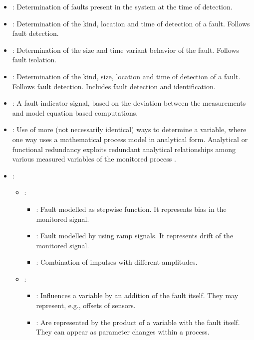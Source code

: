 \begin{itemize}
        \item {}: Determination of faults present in the system at the time of detection.
        \item {}: Determination of the kind, location and time of detection of a fault. Follows fault detection.
        \item {}: Determination of the size and time variant behavior of the fault. Follows fault isolation.
        \item {}: Determination of the kind, size, location and time of detection of a fault. Follows fault detection. Includes fault detection and identification.
        \item {}: A fault indicator signal, based on the deviation between the measurements and model equation based computations.
        \item {}: Use of more (not necessarily identical) ways to determine a variable, where
                one way uses a mathematical process model in analytical form. Analytical or functional redundancy
                exploits redundant analytical relationships among various measured variables of the monitored process \cite{chen2012robust}.
        \item {}:
        \begin{itemize}
                \item {}:
                \begin{itemize}
                        \item {}: Fault modelled as stepwise function. It represents bias in the monitored signal.
                        \item {}: Fault modelled by using ramp signals. It represents drift of the monitored signal.
                        \item {}: Combination of impulses with different amplitudes.
                \end{itemize}
                \item {}:
                \begin{itemize}
                        \item {}: Influences a variable by an addition of the fault itself. They may represent, e.g., offsets of sensors.
                        \item {}: Are represented by the product of a variable with the fault itself. They can appear as parameter changes within a process.
                \end{itemize}
        \end{itemize}
\end{itemize}


